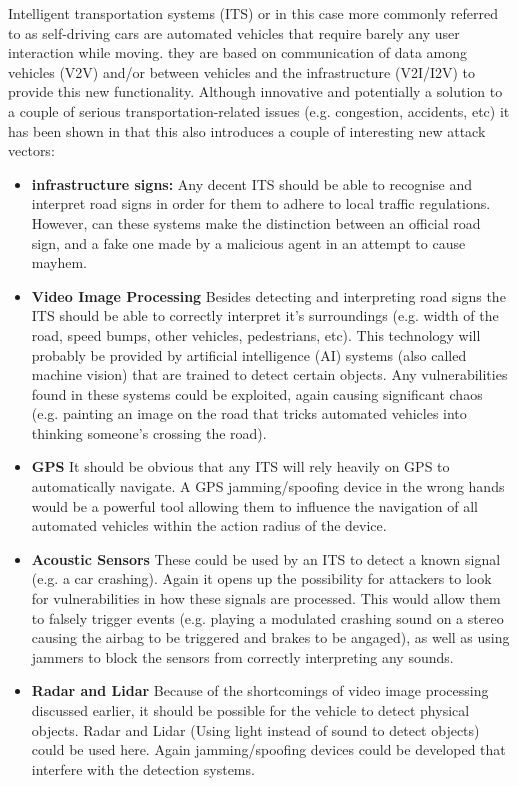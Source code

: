 Intelligent transportation systems (ITS) or in this case more commonly referred to as self-driving cars are automated vehicles that require barely any user interaction while moving. they are based on communication of data among vehicles (V2V) and/or between vehicles and the infrastructure (V2I/I2V) to provide this new functionality. Although innovative and potentially a solution to a couple of serious transportation-related issues (e.g. congestion, accidents, etc) it has been shown in \cite{Petit} that this also introduces a couple of interesting new attack vectors:   

\begin{itemize}
	\item \textbf{infrastructure signs:} Any decent ITS should be able to recognise and interpret road signs in order for them to adhere to local traffic regulations. However, can these systems make the distinction between an official road sign, and a fake one made by a malicious agent in an attempt to cause mayhem.\cite{Petit}
	
	\item \textbf{Video Image Processing} Besides detecting and interpreting road signs the ITS should be able to correctly interpret it's surroundings (e.g. width of the road, speed bumps, other vehicles, pedestrians, etc). This technology will probably be provided by artificial intelligence (AI) systems (also called machine vision) that are trained to detect certain objects. Any vulnerabilities found in these systems could be exploited, again causing significant chaos (e.g. painting an image on the road that tricks automated vehicles into thinking someone's crossing the road).\cite{Petit}
	
	\item \textbf{GPS} It should be obvious that any ITS will rely heavily on GPS to automatically navigate. A GPS jamming/spoofing device in the wrong hands would be a powerful tool allowing them to influence the navigation of all automated vehicles within the action radius of the device.\cite{Petit}
	
	\item \textbf{Acoustic Sensors} These could be used by an ITS to detect a known signal (e.g. a car crashing). Again it opens up the possibility for attackers to look for vulnerabilities in how these signals are processed. This would allow them to falsely trigger events (e.g. playing a modulated crashing sound on a stereo causing the airbag to be triggered and brakes to be angaged), as well as using jammers to block the sensors from correctly interpreting any sounds.\cite{Petit}
	
	\item \textbf{Radar and Lidar} Because of the shortcomings of video image processing discussed earlier, it should be possible for the vehicle to detect physical objects. Radar and Lidar (Using light instead of sound to detect objects) could be used here. Again jamming/spoofing devices could be developed that interfere with the detection systems.\cite{Petit}
\end{itemize}


